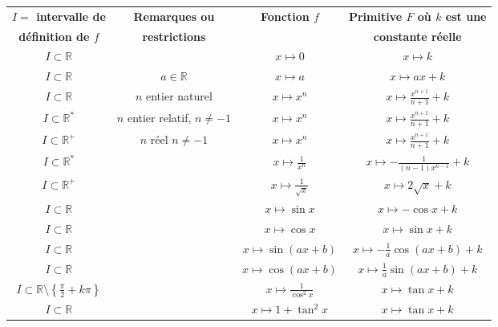 \documentclass{article}
\begin{document}
\begin{table}[h!]
    \centering
    \renewcommand{\arraystretch}{1.5}
    \begin{tabular}{|c|c|c|c|}
        \hline
        \textbf{\( I = \) intervalle de} & \textbf{Remarques ou} & \textbf{Fonction \( f \)} & \textbf{Primitive \( F \) où \( k \) est une} \\
        \textbf{définition de \( f \)} & \textbf{restrictions} & & \textbf{constante réelle} \\
        \hline
        \( I \subset \mathbb{R} \) & & \( x \mapsto 0 \) & \( x \mapsto k \) \\
        \hline
        \( I \subset \mathbb{R} \) & \( a \in \mathbb{R} \) & \( x \mapsto a \) & \( x \mapsto ax + k \) \\
        \hline
        \( I \subset \mathbb{R} \) & \( n \) entier naturel & \( x \mapsto x^n \) & \( x \mapsto \frac{x^{n+1}}{n+1} + k \) \\
        \hline
        \( I \subset \mathbb{R}^* \) & \( n \) entier relatif, \( n \neq -1 \) & \( x \mapsto x^n \) & \( x \mapsto \frac{x^{n+1}}{n+1} + k \) \\
        \hline
        \( I \subset \mathbb{R}^+ \) & \( n \) réel \( n \neq -1 \) & \( x \mapsto x^n \) & \( x \mapsto \frac{x^{n+1}}{n+1} + k \) \\
        \hline
        \( I \subset \mathbb{R}^* \) & & \( x \mapsto \frac{1}{x^n} \) & \( x \mapsto -\frac{1}{(n-1)x^{n-1}} + k \) \\
        \hline
        \( I \subset \mathbb{R}^+ \) & & \( x \mapsto \frac{1}{\sqrt{x}} \) & \( x \mapsto 2\sqrt{x} + k \) \\
        \hline
        \( I \subset \mathbb{R} \) & & \( x \mapsto \sin x \) & \( x \mapsto -\cos x + k \) \\
        \hline
        \( I \subset \mathbb{R} \) & & \( x \mapsto \cos x \) & \( x \mapsto \sin x + k \) \\
        \hline
        \( I \subset \mathbb{R} \) & & \( x \mapsto \sin(ax+b) \) & \( x \mapsto -\frac{1}{a} \cos(ax+b) + k \) \\
        \hline
        \( I \subset \mathbb{R} \) & & \( x \mapsto \cos(ax+b) \) & \( x \mapsto \frac{1}{a} \sin(ax+b) + k \) \\
        \hline
        \( I \subset \mathbb{R} \setminus \left\{ \frac{\pi}{2} + k\pi \right\} \) & & \( x \mapsto \frac{1}{\cos^2 x} \) & \( x \mapsto \tan x + k \) \\
        \hline
        \( I \subset \mathbb{R} \) & & \( x \mapsto 1 + \tan^2 x \) & \( x \mapsto \tan x + k \) \\

\end{tabular}
\end{table}
\end{document}
